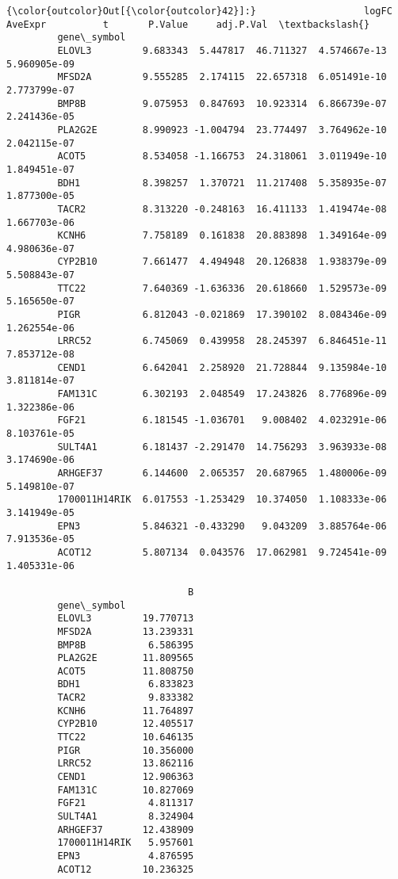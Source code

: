 \documentclass[11pt]{article}
\begin{document}
\begin{Verbatim}[commandchars=\\\{\}]
{\color{outcolor}Out[{\color{outcolor}42}]:}                   logFC   AveExpr          t       P.Value     adj.P.Val  \textbackslash{}
         gene\_symbol                                                                
         ELOVL3         9.683343  5.447817  46.711327  4.574667e-13  5.960905e-09   
         MFSD2A         9.555285  2.174115  22.657318  6.051491e-10  2.773799e-07   
         BMP8B          9.075953  0.847693  10.923314  6.866739e-07  2.241436e-05   
         PLA2G2E        8.990923 -1.004794  23.774497  3.764962e-10  2.042115e-07   
         ACOT5          8.534058 -1.166753  24.318061  3.011949e-10  1.849451e-07   
         BDH1           8.398257  1.370721  11.217408  5.358935e-07  1.877300e-05   
         TACR2          8.313220 -0.248163  16.411133  1.419474e-08  1.667703e-06   
         KCNH6          7.758189  0.161838  20.883898  1.349164e-09  4.980636e-07   
         CYP2B10        7.661477  4.494948  20.126838  1.938379e-09  5.508843e-07   
         TTC22          7.640369 -1.636336  20.618660  1.529573e-09  5.165650e-07   
         PIGR           6.812043 -0.021869  17.390102  8.084346e-09  1.262554e-06   
         LRRC52         6.745069  0.439958  28.245397  6.846451e-11  7.853712e-08   
         CEND1          6.642041  2.258920  21.728844  9.135984e-10  3.811814e-07   
         FAM131C        6.302193  2.048549  17.243826  8.776896e-09  1.322386e-06   
         FGF21          6.181545 -1.036701   9.008402  4.023291e-06  8.103761e-05   
         SULT4A1        6.181437 -2.291470  14.756293  3.963933e-08  3.174690e-06   
         ARHGEF37       6.144600  2.065357  20.687965  1.480006e-09  5.149810e-07   
         1700011H14RIK  6.017553 -1.253429  10.374050  1.108333e-06  3.141949e-05   
         EPN3           5.846321 -0.433290   9.043209  3.885764e-06  7.913536e-05   
         ACOT12         5.807134  0.043576  17.062981  9.724541e-09  1.405331e-06   
         
                                B  
         gene\_symbol               
         ELOVL3         19.770713  
         MFSD2A         13.239331  
         BMP8B           6.586395  
         PLA2G2E        11.809565  
         ACOT5          11.808750  
         BDH1            6.833823  
         TACR2           9.833382  
         KCNH6          11.764897  
         CYP2B10        12.405517  
         TTC22          10.646135  
         PIGR           10.356000  
         LRRC52         13.862116  
         CEND1          12.906363  
         FAM131C        10.827069  
         FGF21           4.811317  
         SULT4A1         8.324904  
         ARHGEF37       12.438909  
         1700011H14RIK   5.957601  
         EPN3            4.876595  
         ACOT12         10.236325  
\end{Verbatim}
            
\end{document}
